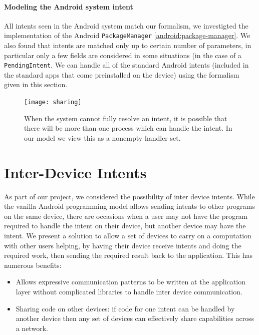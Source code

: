 \documentclass{acm_proc_article-sp}
\begin{document}
\paragraph*{Modeling the Android system intent}\label{section:intents-model}
All intents seen in the Android system match our formalism, we
investigted the implementation of the Android \texttt{PackageManager}
\ref{android:package-manager}.  We also found that intents are matched
only up to certain number of parameters, in particular only a few
fields are considered in some situations (in the case of a
\texttt{PendingIntent}.  We can handle all of the standard Android
intents (included in the standard apps that come preinstalled on the
device) using the formalism given in this section.

\begin{figure}[t]
  \centering
    \texttt{[image: sharing]}
    \caption{When the system cannot fully resolve an intent, it is
      possible that there will be more than one process which can
      handle the intent.  In our model we view this as a nonempty
      handler set.}
\end{figure}

\section{Inter-Device Intents}

As part of our project, we considered the possibility of inter device
intents.  While the vanilla Android programming model allows sending
intents to other programs on the same device, there are occasions when
a user may not have the program required to handle the intent on their
device, but another device may have the intent.  We present a solution
to allow a set of devices to carry on a computation with other users
helping, by having their device receive intents and doing the required
work, then sending the required result back to the application.  This
has numerous benefits:

\begin{itemize}
\item Allows expressive communication patterns to be written at the
  application layer without complicated libraries to handle inter
  device communication.
\item Sharing code on other devices: if code for one intent
  can be handled by another device then any set of devices can
  effectively share capabilities across a network.
\end{itemize}
\end{document}
